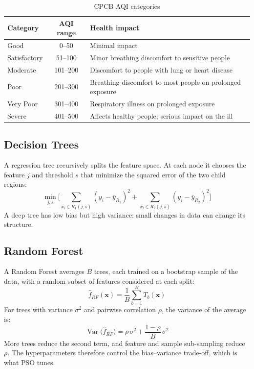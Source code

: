 \begin{table}[H]
\centering
\caption{CPCB AQI categories}
\begin{tabular}{|l|c|l|}
\hline
\textbf{Category} & \textbf{AQI range} & \textbf{Health impact} \\ \hline
Good & 0--50 & Minimal impact \\
Satisfactory & 51--100 & Minor breathing discomfort to sensitive people \\
Moderate & 101--200 & Discomfort to people with lung or heart disease \\
Poor & 201--300 & Breathing discomfort to most people on prolonged exposure \\
Very Poor & 301--400 & Respiratory illness on prolonged exposure \\
Severe & 401--500 & Affects healthy people; serious impact on the ill \\ \hline
\end{tabular}
\end{table}

\subsection{Decision Trees}
A regression tree recursively splits the feature space. At each node it chooses the feature $j$ and threshold $s$ that minimize the squared error of the two child regions:
\begin{equation}
\min_{j,s}\Big[\sum_{x_i \in R_1(j,s)} (y_i - \bar{y}_{R_1})^2 + \sum_{x_i \in R_2(j,s)} (y_i - \bar{y}_{R_2})^2\Big]
\end{equation}
A deep tree has low bias but high variance: small changes in data can change its structure.

\subsection{Random Forest}
A Random Forest \cite{breiman2001} averages $B$ trees, each trained on a bootstrap sample of the data, with a random subset of features considered at each split:
\begin{equation}
\hat{f}_{RF}(\mathbf{x}) = \frac{1}{B}\sum_{b=1}^{B} T_b(\mathbf{x})
\end{equation}
For trees with variance $\sigma^2$ and pairwise correlation $\rho$, the variance of the average is:
\begin{equation}
\operatorname{Var}\big(\hat{f}_{RF}\big) = \rho\,\sigma^2 + \frac{1-\rho}{B}\,\sigma^2
\end{equation}
More trees reduce the second term, and feature and sample sub-sampling reduce $\rho$. The hyperparameters therefore control the bias--variance trade-off, which is what PSO tunes.


